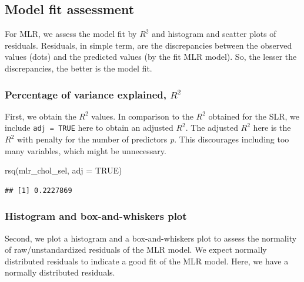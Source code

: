 \documentclass[
  10pt,
]{krantz}
\newenvironment{Shaded}{\begin{snugshade}}{\end{snugshade}}
\newcommand{\AttributeTok}[1]{\textcolor[rgb]{0.77,0.63,0.00}{#1}}
\newcommand{\ConstantTok}[1]{\textcolor[rgb]{0.00,0.00,0.00}{#1}}
\newcommand{\FunctionTok}[1]{\textcolor[rgb]{0.00,0.00,0.00}{#1}}
\newcommand{\NormalTok}[1]{#1}
\begin{document}
\hypertarget{model-fit-assessment-1}{%
\subsection{\texorpdfstring{Model fit assessment}{Model fit assessment}}\label{model-fit-assessment-1}}

For MLR, we assess the model fit by \(R^2\) and histogram and scatter plots of residuals. Residuals, in simple term, are the discrepancies between the observed values (dots) and the predicted values (by the fit MLR model). So, the lesser the discrepancies, the better is the model fit.

\hypertarget{percentage-of-variance-explained-r2}{%
\subsubsection*{\texorpdfstring{Percentage of variance explained, \(R^2\)}{Percentage of variance explained, R\^{}2}}\label{percentage-of-variance-explained-r2}}


First, we obtain the \(R^2\) values. In comparison to the \(R^2\) obtained for the SLR, we include \texttt{adj\ =\ TRUE} here to obtain an adjusted \(R^2\). The adjusted \(R^2\) here is the \(R^2\) with penalty for the number of predictors \emph{p}. This discourages including too many variables, which might be unnecessary.

\begin{Shaded}
\begin{Highlighting}[]
\FunctionTok{rsq}\NormalTok{(mlr\_chol\_sel, }\AttributeTok{adj =} \ConstantTok{TRUE}\NormalTok{)}
\end{Highlighting}
\end{Shaded}

\begin{verbatim}
## [1] 0.2227869
\end{verbatim}

\hypertarget{histogram-and-box-and-whiskers-plot}{%
\subsubsection*{Histogram and box-and-whiskers plot}\label{histogram-and-box-and-whiskers-plot}}


Second, we plot a histogram and a box-and-whiskers plot to assess the normality of raw/unstandardized residuals of the MLR model. We expect normally distributed residuals to indicate a good fit of the MLR model. Here, we have a normally distributed residuals.
\end{document}
